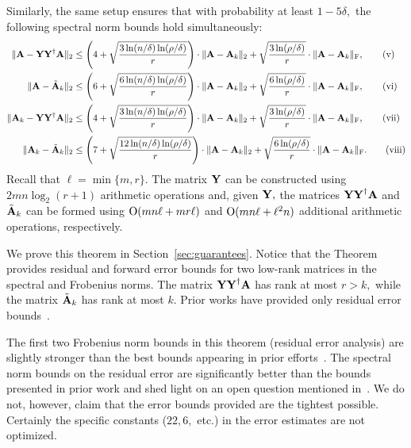 \begin{theorem}
Similarly, the same setup ensures that with probability at least $1 - 5\delta,$ the following spectral norm bounds hold simultaneously:
\begin{align}
 \mbox{}\|{\bm{\mathrm{A}}} - {\bm{\mathrm{Y}}} {{\bm{\mathrm{Y}}}}^\dagger {\ensuremath{\bm{\mathrm{A}}}}\|_2 & \leq \left(4 +
 \sqrt{{3 \ln(n/\delta)\ln(\rho/\delta)\over r}} \right) \cdot \mbox{}\|{\bm{\mathrm{A}}} - {\bm{\mathrm{A}}}_k\|_2 +
 \sqrt{{3 \ln(\rho/\delta)\over r}} \cdot \mbox{}\|{\bm{\mathrm{A}}} - {\bm{\mathrm{A}}}_k\|_\mathrm{F}, \tag{v} \\
 \mbox{}\|{\bm{\mathrm{A}}} -  \tilde{{\bm{\mathrm{A}}}}_k  \|_2 & \leq \left(6 +
 \sqrt{{6 \ln(n/\delta)\ln(\rho/\delta)\over r}} \right) \cdot \mbox{}\|{\bm{\mathrm{A}}} - {\bm{\mathrm{A}}}_k\|_2 +
 \sqrt{{6 \ln(\rho/\delta)\over r}} \cdot \mbox{}\|{\bm{\mathrm{A}}} - {\bm{\mathrm{A}}}_k\|_\mathrm{F}, \tag{vi} \\
 \mbox{}\|{\bm{\mathrm{A}}}_k - {\bm{\mathrm{Y}}} {{\bm{\mathrm{Y}}}}^\dagger {\ensuremath{\bm{\mathrm{A}}}}\|_2 & \leq
\left(4 + \sqrt{{3 \ln(n/\delta)\ln(\rho/\delta)\over r}} \right) \cdot \mbox{}\|{\bm{\mathrm{A}}} - {\bm{\mathrm{A}}}_k\|_2  +
\sqrt{{3 \ln(\rho/\delta)\over r}} \cdot \mbox{}\|{\bm{\mathrm{A}}} - {\bm{\mathrm{A}}}_k\|_\mathrm{F}, \tag{vii} \\
 \mbox{}\|{\bm{\mathrm{A}}}_k - \tilde{{\bm{\mathrm{A}}}}_k\|_2 & \leq \left(7 +
 \sqrt{{12 \ln(n/\delta)\ln(\rho/\delta)\over r}} \right) \cdot \mbox{}\|{\bm{\mathrm{A}}} - {\bm{\mathrm{A}}}_k\|_2 +
 \sqrt{{6 \ln(\rho/\delta)\over r}} \cdot \mbox{}\|{\bm{\mathrm{A}}} - {\bm{\mathrm{A}}}_k\|_\mathrm{F}. \tag{viii}
\end{align}
Recall that $\ell = \min\{m,r\}.$ The matrix ${\bm{\mathrm{Y}}} $ can be constructed using $2 m n \log_2 (r+1)$ arithmetic operations and,
given ${\bm{\mathrm{Y}}},$ the matrices ${\bm{\mathrm{Y}}}{{\bm{\mathrm{Y}}}}^\dagger {\ensuremath{\bm{\mathrm{A}}}}$ and $\tilde{{\bm{\mathrm{A}}}}_k$ can be formed using
$\mathrm{O}(m n \ell + m r \ell)$ and $\mathrm{O}( mn \ell + \ell^2 n)$ additional arithmetic operations, respectively.
\end{theorem}


We prove this theorem in Section~\ref{sec:guarantees}. Notice that the Theorem provides residual and forward error bounds for two low-rank matrices in the
spectral and Frobenius norms. The matrix $ {\bm{\mathrm{Y}}} {{\bm{\mathrm{Y}}}}^\dagger {\ensuremath{\bm{\mathrm{A}}}}$ has rank at most $r > k,$ while the matrix $\tilde{{\bm{\mathrm{A}}}}_k$ has rank at most $k.$
Prior works have provided only residual error bounds~\cite{WLRT07,HMT,NDT09}.

The first two Frobenius norm bounds in this theorem (residual error analysis) are slightly stronger than the best bounds appearing in prior efforts~\cite{NDT09}.
The spectral norm bounds on the residual error are significantly better than the bounds presented in prior work and shed light on an open question mentioned in~\cite{NDT09}.
We do not, however, claim that the error bounds provided are the tightest possible. Certainly the specific constants ($22, 6,$ etc.) in the error estimates are not optimized.

